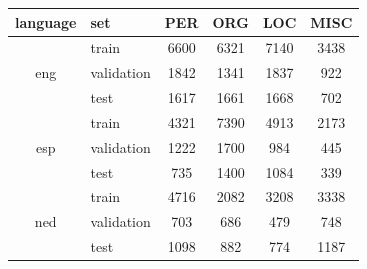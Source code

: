 \documentclass[times, utf8, seminar]{fer}
\begin{document}
\begin{center}
\begin{tabular}{ |c|l|c|c|c|c| }
\hline
language & set & PER & ORG & LOC & MISC \\ \hline
\multirow{3}{*}{eng} & train & 6600 & 6321 & 7140 & 3438 \\
 & validation & 1842 & 1341 & 1837 & 922 \\
 & test & 1617 & 1661 & 1668 & 702 \\ \hline
\multirow{3}{*}{esp} & train & 4321 & 7390 & 4913 & 2173 \\
 & validation & 1222 & 1700 & 984 & 445\\
 & test & 735 & 1400 & 1084  & 339 \\ \hline
\multirow{3}{*}{ned} & train & 4716 & 2082 & 3208 & 3338 \\
 & validation & 703 & 686 & 479 & 748 \\
 & test & 1098 & 882 & 774 & 1187 \\ \hline
\end{tabular}
\end{center}


\begin{center}

\end{center}

\begin{center}
\end{center}
\end{document}
